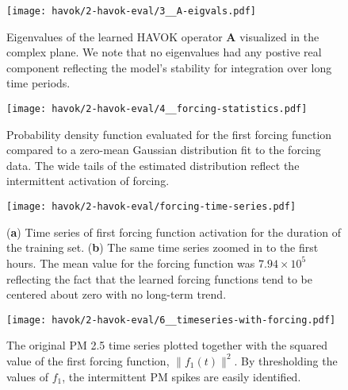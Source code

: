 \begin{figure}[h]
  \centering
  \texttt{[image: havok/2-havok-eval/3\_\_A-eigvals.pdf]}
  \caption{Eigenvalues of the learned HAVOK operator $\mathbf{A}$ visualized in
    the complex plane. We note that no eigenvalues had any postive real
    component reflecting the model's stability for integration over long time periods. }
  \label{fig:pm-havok-eigvals}
\end{figure}



\begin{figure}[h]
  \centering
  \texttt{[image: havok/2-havok-eval/4\_\_forcing-statistics.pdf]}
  \caption{Probability density function evaluated for the first forcing function
  compared to a zero-mean Gaussian distribution fit to the forcing data. The
  wide tails of the estimated distribution reflect the intermittent activation
  of forcing.}
  \label{fig:pm-forcing-stats}
\end{figure}


\begin{figure}[h]
  \centering
  \texttt{[image: havok/2-havok-eval/forcing-time-series.pdf]}
  \caption{(\textbf{a}) Time series of first forcing function activation for the
    duration of the training set. (\textbf{b}) The same time series zoomed in to
    the first hours. The mean value for the forcing function was $7.94\times
    10^5$ reflecting the fact that the learned forcing functions tend to be
    centered about zero with no long-term trend.}
  \label{fig:pm-forcing-time-series}
\end{figure}


\begin{figure}[h]
  \centering
  \texttt{[image: havok/2-havok-eval/6\_\_timeseries-with-forcing.pdf]}
  \caption{The original PM 2.5 time series plotted together with the squared
    value of the first forcing function, $\lVert  f_1(t) \rVert^2$. By
    thresholding the values of $f_1$, the intermittent PM spikes are easily
    identified. }
  \label{fig:pm-time-series-w-forcing}
\end{figure}




